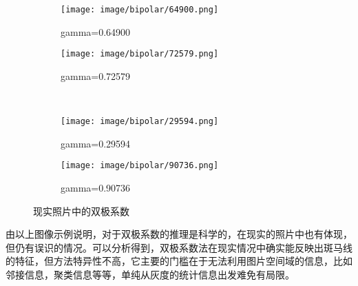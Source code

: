 \begin{figure}[h]
    \centering
    \begin{subfigure}{.5\textwidth}
        \centering
        \texttt{[image: image/bipolar/64900.png]}
        \caption{gamma=0.64900}
    \end{subfigure}%
    \begin{subfigure}{.5\textwidth}
        \centering
        \texttt{[image: image/bipolar/72579.png]}
        \caption{gamma=0.72579}
    \end{subfigure} \\
    \begin{subfigure}{.5\textwidth}
        \centering
        \texttt{[image: image/bipolar/29594.png]}
        \caption{gamma=0.29594}
    \end{subfigure}%
    \begin{subfigure}{.5\textwidth}
        \centering
        \texttt{[image: image/bipolar/90736.png]}
        \caption{gamma=0.90736}
    \end{subfigure}
    \caption{现实照片中的双极系数}
    \end{figure}
\par
由以上图像示例说明，对于双极系数的推理是科学的，在现实的照片中也有体现，但仍有误识的情况。可以分析得到，双极系数法在现实情况中确实能反映出斑马线的特征，但方法特异性不高，它主要的门槛在于无法利用图片空间域的信息，比如邻接信息，聚类信息等等，单纯从灰度的统计信息出发难免有局限。
    

